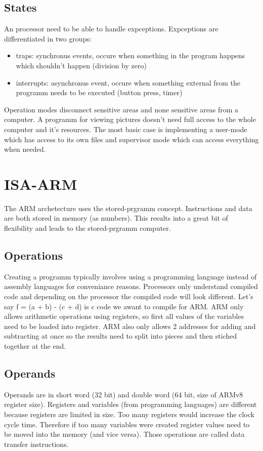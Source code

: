\documentclass[a4paper]{scrartcl}
\begin{document}
        \subsection{States}
            An processor need to be able to handle expceptions. Expceptions are differentiated in two groups:
            \begin{itemize}
                \item traps: synchronus events, occure when something in the program happens which shouldn't happen (division by zero)
                \item interrupts: asynchronus event, occure when something external from the programm needs to be executed (button press, timer)
            \end{itemize}  
            Operation modes disconnect sensitive areas and none sensitive areas from a computer. A programm for viewing pictures doesn't need full access to the whole
            computer and it's resources. The most basic case is implementing a user-mode which has access to its own files and supervisor mode which can access everything when needed.
            
    \section{ISA-ARM}
        The ARM archetecture uses the stored-prgramm concept. Instructions and data are both stored in memory (as numbers). This results into a great bit of flexibility and
        leads to the stored-prgramm computer.
        \subsection{Operations}
            Creating a programm typically involves using a programming language instead of assembly languages for conveniance reasons. Processors only understand compiled code and
            depending on the processor the compiled code will look different. Let's say f = (a + b) - (c + d) is c code we awant to compile for ARM. ARM only allows 
            arithmetic operations using registers, so first all values of the variables need to be loaded into register. ARM also only allows 2 addresses for adding and subtracting at once
            so the results need to split into pieces and then stiched together at the end. 
    
        \subsection{Operands}
            Operands are in short word (32 bit) and double word (64 bit, size of ARMv8 register size). Registers and variables (from programming languages) are different
            because registers are limited in size. Too many registers would increase the clock cycle time. %
            Therefore if too many variables were created register values need to be moved into the memory (and vice versa). Those operations are called data transfer instructions.
            
\end{document}

